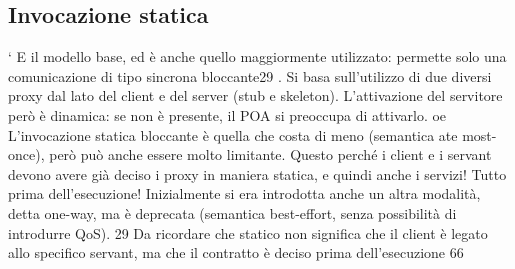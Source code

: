 \subsection{Invocazione statica}
`
E il modello base, ed è anche quello maggiormente utilizzato: permette solo una
comunicazione di tipo sincrona bloccante29 . Si basa sull'utilizzo di due diversi
proxy dal lato del client e del server (stub e skeleton). L'attivazione del servitore
però è dinamica: se non è presente, il POA si preoccupa di attivarlo.
oe
L'invocazione statica bloccante è quella che costa di meno (semantica ate
most-once), però può anche essere molto limitante. Questo perché i client e
i servant devono avere già deciso i proxy in maniera statica, e quindi anche i
servizi! Tutto prima dell'esecuzione!
Inizialmente si era introdotta anche un altra modalità, detta one-way, ma è
deprecata (semantica best-effort, senza possibilità di introdurre QoS).
29 Da ricordare che statico non significa che il client è legato allo specifico servant, ma che il
contratto è deciso prima dell'esecuzione
66
